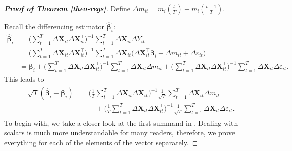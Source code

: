 \documentclass[a4paper,12pt]{article}
\makeatletter
\renewcommand{\eqref}[1]{\tagform@{\ref{#1}}}
\makeatother
\begin{document}
\begin{proof}[\textnormal{\textbf{Proof of Theorem \ref{theo-regs}}}]
Define $\Delta m_{it} = m_i \left( \frac{t}{T} \right) - m_i \left(\frac{t-1}{T}\right)$.

Recall the differencing estimator $\widehat{\bm{\beta}}_i$:
\begin{align*}
\widehat{\bm{\beta}}_i &= \Big( \sum_{t=1}^T \Delta \mathbf{X}_{it} \Delta \mathbf{X}_{it}^\top \Big)^{-1} \sum_{t=1}^T \Delta \mathbf{X}_{it} \Delta Y_{it} \\
& =  \Big( \sum_{t=1}^T \Delta \mathbf{X}_{it} \Delta \mathbf{X}_{it}^\top \Big)^{-1} \sum_{t=1}^T \Delta \mathbf{X}_{it} \bigg(\Delta \mathbf{X}_{it}^\top \bm{\beta}_i +  \Delta m_{it}+ \Delta \varepsilon_{it} \bigg) \\
&= \bm{\beta}_i +   \Big( \sum_{t=1}^T \Delta \mathbf{X}_{it} \Delta \mathbf{X}_{it}^\top \Big)^{-1} \sum_{t=1}^T \Delta \mathbf{X}_{it} \Delta m_{it} +  \Big( \sum_{t=1}^T \Delta \mathbf{X}_{it} \Delta \mathbf{X}_{it}^\top \Big)^{-1} \sum_{t=1}^T \Delta \mathbf{X}_{it} \Delta \varepsilon_{it}. 
\end{align*}
This leads to
\begin{align}\label{theo-regs-proof-1}
\begin{split}
 \sqrt{T}( \widehat{\bm{\beta}}_i - \bm{\beta}_i) = &\Big( \frac{1}{T}\sum_{t=1}^T \Delta \mathbf{X}_{it} \Delta \mathbf{X}_{it}^\top \Big)^{-1} \frac{1}{\sqrt{T}}\sum_{t=1}^T \Delta \mathbf{X}_{it} \Delta m_{it} \\
&\quad+  \Big(\frac{1}{T} \sum_{t=1}^T \Delta \mathbf{X}_{it} \Delta \mathbf{X}_{it}^\top \Big)^{-1}\frac{1}{\sqrt{T}} \sum_{t=1}^T \Delta \mathbf{X}_{it} \Delta \varepsilon_{it}.
\end{split}
\end{align}
To begin with, we take a closer look at the first summand in \eqref{theo-regs-proof-1}. Dealing with scalars is much more understandable for many readers, therefore, we  prove everything for each of the elements of the vector separately.


\end{proof}
\end{document}
